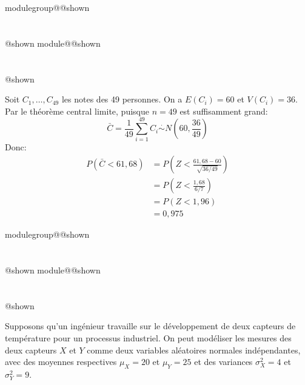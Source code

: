\documentclass{Evaluation}
\makeatletter
\newcommand{\currentmodulekey}{}
\newcommand{\currentmoduletitle}{}
\newcommand{\currentgroupkey}{}
\newcommand{\currentgrouptitle}{}
\newcommand{\showmoduleifneeded}{%
  \ifx\currentgroupkey\empty\else
    \expandafter\ifx\csname modulegroup@\currentgroupkey @shown\endcsname\relax
      \section*{\currentgrouptitle}%
      \expandafter\gdef\csname modulegroup@\currentgroupkey @shown\endcsname{1}%
    \fi
  \fi
  \expandafter\ifx\csname module@\currentmodulekey @shown\endcsname\relax
    \section*{\currentmoduletitle}%
    \expandafter\gdef\csname module@\currentmodulekey @shown\endcsname{1}%
  \fi
}
\newenvironment{H24}{\showmoduleifneeded}{}
\newenvironment{H26r}{\showmoduleifneeded}{}
\makeatother
\begin{document}
\begin{questions}
\begin{H26r}
\begin{parts}
\begin{solution}
    Soit $C_1,\hdots,C_{49}$ les notes des 49 personnes. On a $E(C_i)=60$ et $V(C_i)=36$. Par le théorème central limite, puisque $n=49$ est suffisamment grand:
    $$\bar{C}=\frac{1}{49}\sum_{i=1}^{49}C_i \stackrel{\cdot}{\sim} N\left(60,\frac{36}{49}\right)$$
    Donc:
    \begin{align*}
        P(\bar{C}<61{,}68)&=P\left(Z<\frac{61{,}68-60}{\sqrt{36/49}}\right)\\
        &= P\left(Z<\frac{1{,}68}{6/7}\right)\\
        &= P(Z<1{,}96)\\
        &= 0{,}975
    \end{align*}
\end{solution}
\end{parts}
\end{H26r}

\begin{H24}
\question {} %
Supposons qu'un ingénieur travaille sur le développement de deux capteurs de température pour un processus industriel. On peut modéliser les mesures des deux capteurs $X$ et $Y$ comme deux variables aléatoires normales indépendantes, avec des moyennes respectives \( \mu_X = 20 \) et \( \mu_Y = 25 \) et des variances \( \sigma_X^2 = 4 \) et \( \sigma_Y^2 =9\).\\

\end{H24}
\end{questions}
\end{document}
